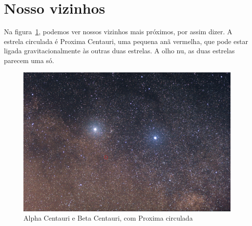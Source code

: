 \documentclass[a4paper,oneside]{article}
\begin{document}
\frenchspacing

\section{Nosso vizinhos}

Na figura~\ref{fig:estrelas}, podemos ver nossos vizinhos mais próximos, por
assim dizer. A estrela circulada é Proxima Centauri, uma pequena anã vermelha,
que pode estar ligada gravitacionalmente às outras duas estrelas. A olho nu, as
duas estrelas parecem uma só.

\begin{figure}[h]
  \centering
  \includegraphics[width=\textwidth]{imagens/alpha-beta-proxima-centauri}
  \caption{Alpha Centauri e Beta Centauri, com Proxima circulada}
  \label{fig:estrelas}
\end{figure}
\end{document}
